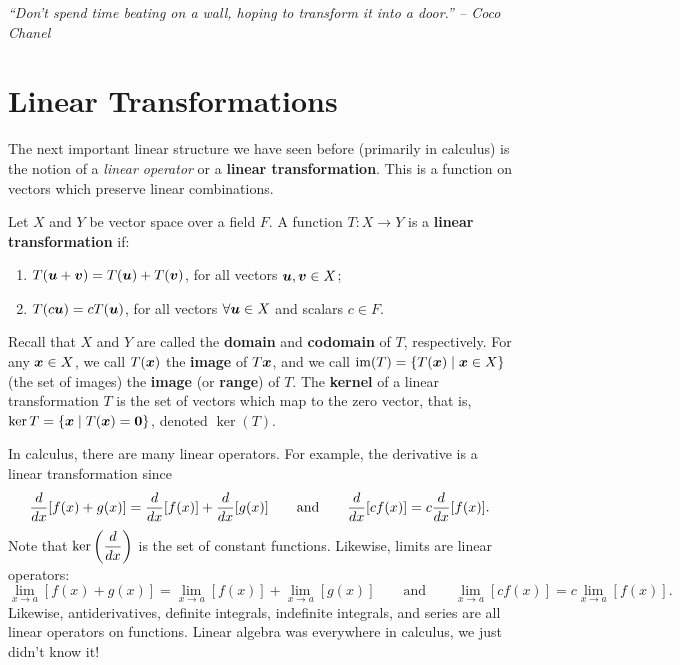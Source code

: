 \begin{center} 
\emph{``Don't spend time beating on a wall, hoping to transform it into a door.'' -- Coco Chanel}
\end{center}

\section{Linear Transformations}\label{sec:trans}

The next important linear structure we have seen before (primarily in calculus) is the notion of a \emph{linear operator} or a \textbf{linear transformation}. This is a function on vectors which preserve linear combinations.\\

\begin{Def}\label{def:linear} Let $X$ and $Y$ be vector space over a field $F$. A function $T : X \to Y$ is a \textbf{linear transformation} if:
\begin{enumerate}[!DEF!, start=1]
\item $T(\boldsymbol u + \boldsymbol v) = T(\boldsymbol u) + T(\boldsymbol v)$, for all vectors $\boldsymbol u, \boldsymbol v \in X$;
\item $T(c\boldsymbol u) = cT(\boldsymbol u)$, for all vectors $\forall \boldsymbol u\in X$ and scalars $c\in F$.
\end{enumerate}
Recall that $X$ and $Y$ are called the \textbf{domain} and \textbf{codomain} of $T$, respectively. For any $\boldsymbol x\in X$, we call $T(\boldsymbol x)$ the \textbf{image} of $T\boldsymbol x$, and we call $\operatorname*{im}(T) = \{T(\boldsymbol x) \mid \boldsymbol x\in X\}$ (the set of images) the \textbf{image} (or \textbf{range}) of $T$. The \textbf{kernel} of a linear transformation $T$ is the set of vectors which map to the zero vector, that is, $\ker T = \{\boldsymbol x\mid T(\boldsymbol x) = \boldsymbol 0\}$, denoted $\ker(T)$.\\
\end{Def}

\begin{Exam} In calculus, there are many linear operators. For example, the derivative is a linear transformation since
\[\dfrac{d}{dx}[f(x)+g(x)] = \dfrac{d}{dx}[f(x)]+\dfrac{d}{dx}[g(x)]\qquad\text{and}\qquad \dfrac{d}{dx}[cf(x)] = c\dfrac{d}{dx}[f(x)].\] Note that $\ker \left(\dfrac{d}{dx}\right)$ is the set of constant functions. Likewise, limits are linear operators:
\[\lim_{x\to a}[f(x) + g(x)] = \lim_{x\to a}[f(x)] + \lim_{x\to a}[g(x)]\qquad\text{and}\qquad \lim_{x\to a}[cf(x)] = c\lim_{x\to a}[f(x)].\]
Likewise, antiderivatives, definite integrals, indefinite integrals, and series are all linear operators on functions. Linear algebra was everywhere in calculus, we just didn't know it!
\end{Exam}\vs

